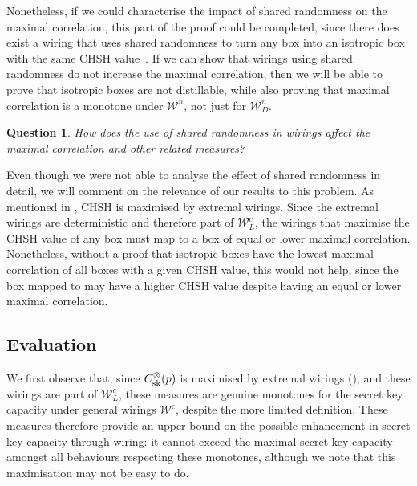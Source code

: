 \documentclass[10pt, a4paper]{article}
\numberwithin{equation}{section} %
\theoremstyle{definition}
\theoremstyle{plain}
\newtheorem{question}{Question}
\newcommand{\?}{\mathrel{?}} %
\newcommand{\sW}{\mathcal{W}}
\newcommand{\sk}{\rm sk}
\begin{document}
                  Nonetheless, if we could characterise the impact of shared randomness on the maximal correlation, this part of the proof could be completed, since there does exist a wiring that uses shared randomness to turn any box into an isotropic box with the same CHSH value~\cite{NSTheories}. If we can show that wirings using shared randomness do not increase the maximal correlation, then we will be able to prove that isotropic boxes are not distillable, while also proving that maximal correlation is a monotone under \(\sW^n\), not just for \(\sW_D^n\).
                  \begin{question}
                    How does the use of shared randomness in wirings affect the maximal correlation and other related measures?
                  \end{question}

                  Even though we were not able to analyse the effect of shared randomness in detail, we will comment on the relevance of our results to this problem. As mentioned in , CHSH is maximised by extremal wirings. Since the extremal wirings are deterministic and therefore part of \(\sW_L^c\), the wirings that maximise the CHSH value of any box must map to a box of equal or lower maximal correlation. Nonetheless, without a proof that isotropic boxes have the lowest maximal correlation of all boxes with a given CHSH value, this would not help, since the box mapped to may have a higher CHSH value despite having an equal or lower maximal correlation.

                  \subsection{Evaluation}

                  We first observe that, since \(C^{\otimes}_{\sk}(p)\) is maximised by extremal wirings (), and these wirings are part of \(\sW_L^c\), these measures are genuine monotones for the secret key capacity under general wirings \(\sW^c\), despite the more limited definition. These measures therefore provide an upper bound on the possible enhancement in secret key capacity through wiring: it cannot exceed the maximal secret key capacity amongst all behaviours respecting these monotones, although we note that this maximisation may not be easy to do.
\end{document}
